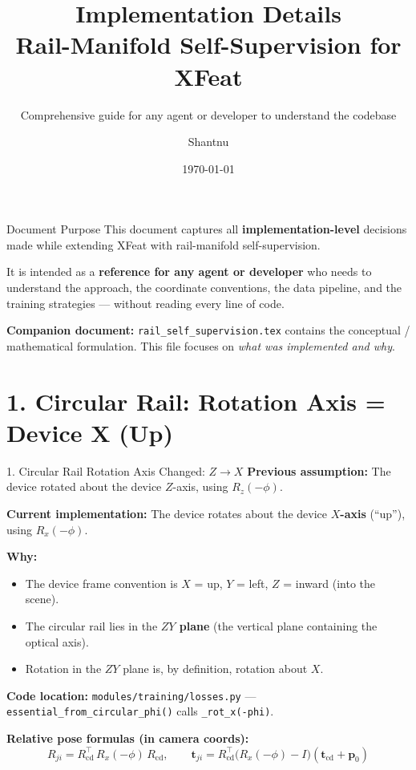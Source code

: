\documentclass[aspectratio=169, 12pt]{beamer}
\title{Implementation Details\\Rail-Manifold Self-Supervision for XFeat}
\subtitle{Comprehensive guide for any agent or developer to understand the codebase}
\author{Shantnu}
\date{\today}
\newcommand{\Rcd}{R_{\mathrm{cd}}}
\newcommand{\tcd}{\mathbf{t}_{\mathrm{cd}}}
\begin{document}
\begin{frame}
\titlepage
\end{frame}

\begin{frame}{Document Purpose}
\small
This document captures all \textbf{implementation-level} decisions made while
extending XFeat with rail-manifold self-supervision.

\medskip
It is intended as a \textbf{reference for any agent or developer} who needs to
understand the approach, the coordinate conventions, the data pipeline, and
the training strategies --- without reading every line of code.

\medskip
\textbf{Companion document:} \texttt{rail\_self\_supervision.tex} contains the
conceptual / mathematical formulation.  This file focuses on \emph{what was
implemented and why}.

\medskip
\tableofcontents
\end{frame}


\section{1. Circular Rail: Rotation Axis = Device X (Up)}

\begin{frame}{1. Circular Rail Rotation Axis Changed: $Z \to X$}
\small
\textbf{Previous assumption:} The device rotated about the device $Z$-axis,
using $R_z(-\phi)$.

\medskip
\textbf{Current implementation:} The device rotates about the device
\textbf{$X$-axis} (``up''), using $R_x(-\phi)$.

\medskip
\textbf{Why:}
\begin{itemize}\setlength{\itemsep}{2pt}
    \item The device frame convention is $X$ = up, $Y$ = left, $Z$ = inward (into the scene).
    \item The circular rail lies in the \textbf{$ZY$ plane} (the vertical plane
          containing the optical axis).
    \item Rotation in the $ZY$ plane is, by definition, rotation about $X$.
\end{itemize}

\medskip
\textbf{Code location:} \texttt{modules/training/losses.py} ---
\texttt{essential\_from\_circular\_phi()} calls \texttt{\_rot\_x(-phi)}.

\medskip
\textbf{Relative pose formulas (in camera coords):}
\[
    R_{ji} = \Rcd^\top \, R_x(-\phi) \, \Rcd, \qquad
    \mathbf{t}_{ji} = \Rcd^\top \bigl(R_x(-\phi) - I\bigr)(\tcd + \mathbf{p}_0)
\]
\end{frame}
\end{document}
